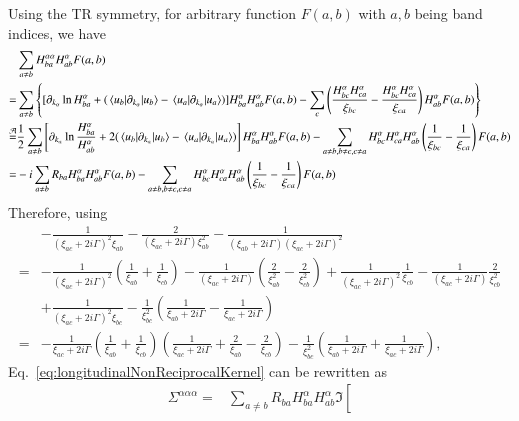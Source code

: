 \documentclass[twocolumn,superscriptaddress]{revtex4-1}
\begin{document}
\begin{widetext}
Using the TR symmetry, for arbitrary function $F(a,b)$ with $a,b$ being band indices, we have
\begin{align}
  &\sum_{a\neq b}H_{ba}^{\alpha\alpha} H_{ab}^\alpha F(a,b) \nonumber \\
  =&\sum_{a\neq b}\left\{[\partial_{k_\alpha} \ln H_{ba}^\alpha+(\mel{u_b}{\partial_{k_\alpha}}{u_b}-\mel{u_a}{\partial_{k_\alpha}}{u_a})]H_{ba}^\alpha H_{ab}^\alpha F(a,b)-\sum_c \left(\frac{H_{bc}^\alpha H_{ca}^\alpha}{\xi_{bc}}-\frac{H_{bc}^\alpha H_{ca}^\alpha}{\xi_{ca}}\right)H_{ab}^\alpha F(a,b)\right\}\nonumber \\
  \overset{\mathcal{A}}{=}&\frac{1}{2}\sum_{a\neq b}\left[\partial_{k_\alpha} \ln \frac{H_{ba}^\alpha}{H_{ab}^\alpha}+2(\mel{u_b}{\partial_{k_\alpha}}{u_b}-\mel{u_a}{\partial_{k_\alpha}}{u_a})\right]H_{ba}^\alpha H_{ab}^\alpha F(a,b)-\sum_{a\neq b, b\neq c, c\neq a} H_{bc}^\alpha H_{ca}^\alpha H_{ab}^\alpha\left(\frac{1}{\xi_{bc}}-\frac{1}{\xi_{ca}}\right) F(a,b) \nonumber \\
  = &-i\sum_{a\neq b} R_{ba}H_{ba}^\alpha H_{ab}^\alpha F(a,b)-\sum_{a\neq b, b\neq c, c\neq a} H_{bc}^\alpha H_{ca}^\alpha H_{ab}^\alpha\left(\frac{1}{\xi_{bc}}-\frac{1}{\xi_{ca}}\right) F(a,b)
\end{align}
Therefore, using
\begin{align}
      &-\frac{1}{(\xi_{ac}+2i\Gamma)^2\xi_{ab}}-\frac{2}{(\xi_{ac}+2i\Gamma)\xi_{ab}^2} -\frac{1}{(\xi_{ab}+2i\Gamma)(\xi_{ac}+2i\Gamma)^2}\nonumber \\
      =&-\frac{1}{(\xi_{ac}+2i\Gamma)^2}\left(
        \frac{1}{\xi_{ab}}+\frac{1}{\xi_{cb}}
      \right)-\frac{1}{(\xi_{ac}+2i\Gamma)}\left(\frac{2}{\xi_{ab}^2}-\frac{2}{\xi_{cb}^2}\right) +\frac{1}{(\xi_{ac}+2i\Gamma)^2}\frac{1}{\xi_{cb}}
      -\frac{1}{(\xi_{ac}+2i\Gamma)}\frac{2}{\xi_{cb}^2}\nonumber \\
      &  +\frac{1}{(\xi_{ac}+2i\Gamma)^2\xi_{bc}}-\frac{1}{\xi_{bc}^2}\left(\frac{1}{\xi_{ab}+2i\Gamma}-\frac{1}{\xi_{ac}+2i\Gamma}\right)\nonumber \\
      =&-\frac{1}{\xi_{ac}+2i\Gamma}\left(
        \frac{1}{\xi_{ab}}+\frac{1}{\xi_{cb}}
      \right)\left(\frac{1}{\xi_{ac}+2i\Gamma}+\frac{2}{\xi_{ab}}-\frac{2}{\xi_{cb}}\right)-\frac{1}{\xi_{bc}^2}\left(\frac{1}{\xi_{ab}+2i\Gamma}+\frac{1}{\xi_{ac}+2i\Gamma}\right),
\end{align}
Eq.~\eqref{eq:longitudinalNonReciprocalKernel} can be rewritten as
\begin{align}
  \Sigma^{\alpha\alpha\alpha} =&\sum_{a\neq b}R_{ba}H_{ba}^\alpha H_{ab}^\alpha \Im \left[

\end{align}
\end{widetext}
\end{document}
